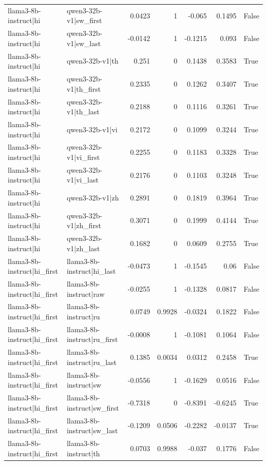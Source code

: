\begin{table}
\begin{tabular}{l l r r r r l}
llama3-8b-instruct|hi & qwen3-32b-v1|sw_first & 0.0423 & 1 & -0.065 & 0.1495 & False \\
llama3-8b-instruct|hi & qwen3-32b-v1|sw_last & -0.0142 & 1 & -0.1215 & 0.093 & False \\
llama3-8b-instruct|hi & qwen3-32b-v1|th & 0.251 & 0 & 0.1438 & 0.3583 & True \\
llama3-8b-instruct|hi & qwen3-32b-v1|th_first & 0.2335 & 0 & 0.1262 & 0.3407 & True \\
llama3-8b-instruct|hi & qwen3-32b-v1|th_last & 0.2188 & 0 & 0.1116 & 0.3261 & True \\
llama3-8b-instruct|hi & qwen3-32b-v1|vi & 0.2172 & 0 & 0.1099 & 0.3244 & True \\
llama3-8b-instruct|hi & qwen3-32b-v1|vi_first & 0.2255 & 0 & 0.1183 & 0.3328 & True \\
llama3-8b-instruct|hi & qwen3-32b-v1|vi_last & 0.2176 & 0 & 0.1103 & 0.3248 & True \\
llama3-8b-instruct|hi & qwen3-32b-v1|zh & 0.2891 & 0 & 0.1819 & 0.3964 & True \\
llama3-8b-instruct|hi & qwen3-32b-v1|zh_first & 0.3071 & 0 & 0.1999 & 0.4144 & True \\
llama3-8b-instruct|hi & qwen3-32b-v1|zh_last & 0.1682 & 0 & 0.0609 & 0.2755 & True \\
llama3-8b-instruct|hi_first & llama3-8b-instruct|hi_last & -0.0473 & 1 & -0.1545 & 0.06 & False \\
llama3-8b-instruct|hi_first & llama3-8b-instruct|raw & -0.0255 & 1 & -0.1328 & 0.0817 & False \\
llama3-8b-instruct|hi_first & llama3-8b-instruct|ru & 0.0749 & 0.9928 & -0.0324 & 0.1822 & False \\
llama3-8b-instruct|hi_first & llama3-8b-instruct|ru_first & -0.0008 & 1 & -0.1081 & 0.1064 & False \\
llama3-8b-instruct|hi_first & llama3-8b-instruct|ru_last & 0.1385 & 0.0034 & 0.0312 & 0.2458 & True \\
llama3-8b-instruct|hi_first & llama3-8b-instruct|sw & -0.0556 & 1 & -0.1629 & 0.0516 & False \\
llama3-8b-instruct|hi_first & llama3-8b-instruct|sw_first & -0.7318 & 0 & -0.8391 & -0.6245 & True \\
llama3-8b-instruct|hi_first & llama3-8b-instruct|sw_last & -0.1209 & 0.0506 & -0.2282 & -0.0137 & True \\
llama3-8b-instruct|hi_first & llama3-8b-instruct|th & 0.0703 & 0.9988 & -0.037 & 0.1776 & False \\

\end{tabular}
\end{table}
